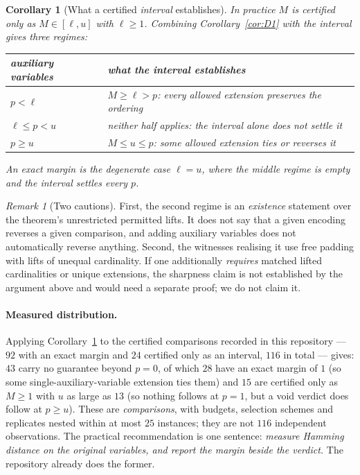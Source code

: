\documentclass[11pt,a4paper]{article}
\theoremstyle{plain}
\newtheorem{corollary}[theorem]{Corollary}
\theoremstyle{definition}
\theoremstyle{remark}
\newtheorem{remark}[theorem]{Remark}
\begin{document}
\begin{corollary}[What a certified \emph{interval} establishes]\label{cor:D2}
In practice $M$ is certified only as $M \in [\ell,u]$ with $\ell \ge 1$.
Combining Corollary~\ref{cor:D1} with the interval gives three regimes:
\begin{center}
\begin{tabular}{ll}
\toprule
auxiliary variables & what the interval establishes \\
\midrule
$p < \ell$          & $M \ge \ell > p$: every allowed extension preserves the ordering \\
$\ell \le p < u$    & neither half applies: the interval alone does not settle it \\
$p \ge u$           & $M \le u \le p$: some allowed extension ties or reverses it \\
\bottomrule
\end{tabular}
\end{center}
An exact margin is the degenerate case $\ell = u$, where the middle regime is
empty and the interval settles every $p$.
\end{corollary}

\begin{remark}[Two cautions]
First, the second regime is an \emph{existence} statement over the theorem's
unrestricted permitted lifts. It does not say that a given encoding reverses a
given comparison, and adding auxiliary variables does not automatically reverse
anything. Second, the witnesses realising it use free padding with lifts of
unequal cardinality. If one additionally \emph{requires} matched lifted
cardinalities or unique extensions, the sharpness claim is not established by
the argument above and would need a separate proof; we do not claim it.
\end{remark}

\paragraph{Measured distribution.}
Applying Corollary~\ref{cor:D2} to the certified comparisons recorded in this
repository --- $92$ with an exact margin and $24$ certified only as an interval,
$116$ in total --- gives: $43$ carry no guarantee beyond $p = 0$, of which $28$
have an exact margin of $1$ (so some single-auxiliary-variable extension ties
them) and $15$ are certified only as $M \ge 1$ with $u$ as large as $13$ (so
nothing follows at $p=1$, but a void verdict does follow at $p \ge u$). These are
\emph{comparisons}, with budgets, selection schemes and replicates nested within
at most $25$ instances; they are not $116$ independent observations. The
practical recommendation is one sentence: \emph{measure Hamming distance on the
original variables, and report the margin beside the verdict.} The repository
already does the former.
\end{document}
